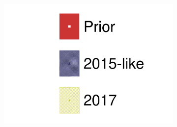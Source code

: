 \begin{figure}[h]
	\begin{subfigure}[t]{0.10\textwidth}
		\includegraphics[width=\textwidth, trim={0mm 0mm 0mm 0mm}, clip,page=1]{figures/mach3/data/alt/2017b_NewData_NewDet_hpc_2015like__2017b_NewData_NewDet_UpdXsecStep_2Xsec_4Det_5Flux_0.pdf}
	\end{subfigure}
	

\end{figure}
